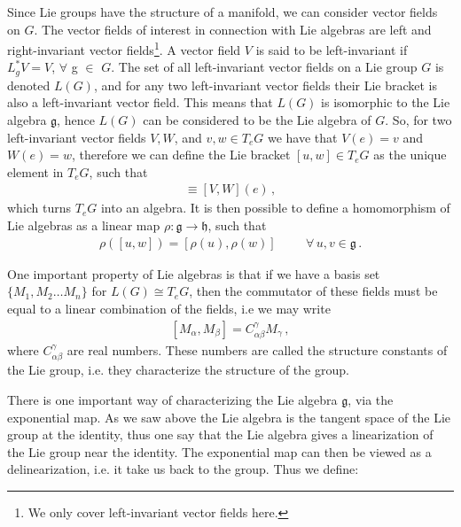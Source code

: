 Since Lie groups have the structure of a manifold, we can consider vector fields on $G$. The vector fields of interest in connection with Lie algebras are left and right-invariant vector fields\footnote{We only cover left-invariant vector fields here.}. A vector field $V$ is said to be left-invariant if $L^{*}_{g}V=V$, $\forall$ g $\in$ $G$. The set of all left-invariant vector fields on a Lie group $G$ is denoted $L(G)$, and for any two left-invariant vector fields their Lie bracket is also a left-invariant vector field. This means that $L(G)$ is isomorphic to the Lie algebra $\mathfrak{g}$, hence $L(G)$ can be considered to be the Lie algebra of $G$. So, for two left-invariant vector fields $V,W$, and $v,w\in T_{e}G$ we have that $V(e)=v$ and $W(e)=w$, therefore we can define the Lie bracket $[u,w]\in T_{e}G$ as the unique element in $T_{e}G$, such that
\begin{align}
    [v,w]\equiv[V,W](e)\,,
\end{align}
which turns $T_{e}G$ into an algebra. It is then possible to define a homomorphism of Lie algebras as a linear map $\rho:\mathfrak{g}\rightarrow\mathfrak{h}$, such that
\begin{align}
    \rho([u,w])=[\rho(u),\rho(w)]\hspace{1cm}\forall\, u,v \in \mathfrak{g}\,.
\end{align}

One important property of Lie algebras is that if we have a basis set $\{M_{1},M_{2}\dots M_{n}\}$ for $L(G)\cong T_{e}G$, then the commutator of these fields must be equal to a linear combination of the fields, i.e we may write
\begin{align}\label{eq:Lie commutator}
    [M_{\alpha},M_{\beta}]=C_{\alpha\beta}^{\gamma}M_{\gamma}\,,
\end{align}
where $C_{\alpha\beta}^{\gamma}$ are real numbers. These numbers are called the structure constants of the Lie group, i.e. they characterize the structure of the group. 

There is one important way of characterizing the Lie algebra $\mathfrak{g}$, via the exponential map. As we saw above the Lie algebra is the tangent space of the Lie group at the identity, thus one say that the Lie algebra gives a linearization of the Lie group near the identity. The exponential map can then be viewed as a delinearization, i.e. it take us back to the group. Thus we define:

